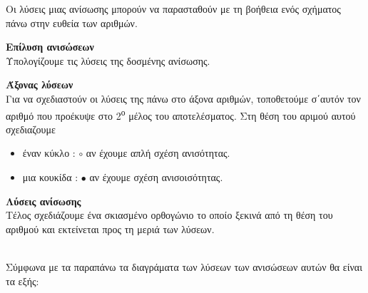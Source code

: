 \documentclass[twoside,nofonts,internet,methodoi]{thewria}
\newcommand{\tss}[1]{\textsuperscript{#1}}
\begin{document}
\begin{Methodos}\label{meth:2}
Οι λύσεις μιας ανίσωσης μπορούν να παρασταθούν με τη βοήθεια ενός σχήματος πάνω στην ευθεία των αριθμών. 
\begin{bhma}
\item \textbf{Επίλυση ανισώσεων}\\
Υπολογίζουμε τις λύσεις της δοσμένης ανίσωσης.
\item \textbf{Άξονας λύσεων}\\
Για να σχεδιαστούν οι λύσεις της πάνω στο άξονα αριθμών, τοποθετούμε σ΄αυτόν τον αριθμό που προέκυψε στο 2\tss{ο} μέλος του αποτελέσματος. Στη θέση του αριμού αυτού σχεδιαζουμε
\begin{itemize}
\item έναν κύκλο : $ \circ $ αν έχουμε απλή σχέση ανισότητας.
\item μια κουκίδα : $ \bullet $ αν έχουμε σχέση ανισοισότητας.
\end{itemize}
\item \textbf{Λύσεις ανίσωσης}\\
Τέλος σχεδιάζουμε ένα σκιασμένο ορθογώνιο το οποίο ξεκινά από τη θέση του αριθμού και εκτείνεται προς τη μεριά των λύσεων.
\end{bhma}
\end{Methodos}
\noindent
\lysh\\
Σύμφωνα με τα παραπάνω τα διαγράματα των λύσεων των ανισώσεων αυτών θα είναι τα εξής:
\begin{multicols}{4}
\begin{rlist}
\item \tikzitem{}
\item \tikzitem{}
\item \tikzitem{}
\item \tikzitem{}
\end{rlist}
\end{multicols}
\end{document}
